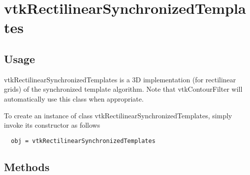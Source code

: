 \section{vtkRectilinearSynchronizedTemplates}

\subsection{Usage}

 vtkRectilinearSynchronizedTemplates is a 3D implementation (for rectilinear
 grids) of the synchronized template algorithm. Note that vtkContourFilter
 will automatically use this class when appropriate.

To create an instance of class vtkRectilinearSynchronizedTemplates, simply
invoke its constructor as follows
\begin{verbatim}
  obj = vtkRectilinearSynchronizedTemplates
\end{verbatim}
\subsection{Methods}

